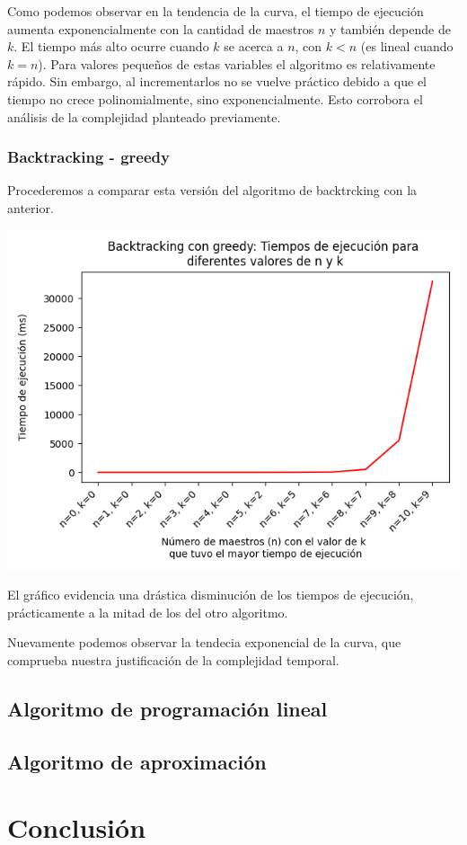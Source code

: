 \documentclass{article}
\begin{document}
Como podemos observar en la tendencia de la curva, el tiempo de ejecución aumenta exponencialmente con la cantidad de maestros $n$ y también depende de $k$. El tiempo más alto ocurre cuando $k$ se acerca a $n$, con $k < n$ (es lineal cuando $k = n$). Para valores pequeños de estas variables el algoritmo es relativamente rápido. Sin embargo, al incrementarlos no se vuelve práctico debido a que el tiempo no crece polinomialmente, sino exponencialmente.  Esto corrobora el análisis de la complejidad planteado previamente.

\subsubsection{Backtracking - greedy}
\label{sec:medidas-bt-greedy}
Procederemos a comparar esta versión del algoritmo de backtrcking con la anterior.

\includegraphics[scale=0.60]{images/graficoBacktrackingGreedy.png}

El gráfico evidencia una drástica disminución de los tiempos de ejecución, prácticamente a la mitad de los del otro algoritmo. 

Nuevamente podemos observar la tendecia exponencial de la curva, que comprueba nuestra justificación de la complejidad temporal.

\subsection{Algoritmo de programación lineal}
\subsection{Algoritmo de aproximación}


\section{Conclusión}
\end{document}
